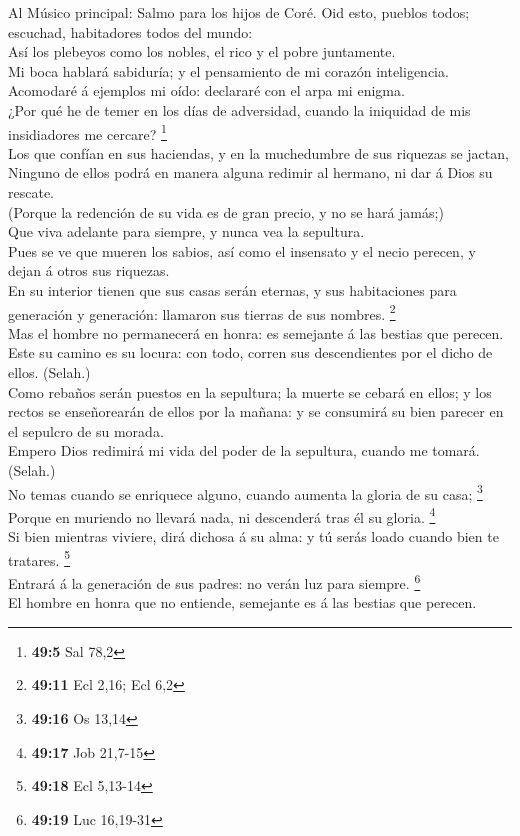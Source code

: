  Al Músico principal: Salmo para los hijos de Coré. Oid
esto, pueblos todos; escuchad, habitadores todos del mundo:\\
 Así los plebeyos como los nobles, el rico y el pobre
juntamente.\\
 Mi boca hablará sabiduría; y el pensamiento de mi corazón
inteligencia.\\
 Acomodaré á ejemplos mi oído: declararé con el arpa mi
enigma.\\
 ¿Por qué he de temer en los días de adversidad, cuando la
iniquidad de mis insidiadores me cercare? \footnote{\textbf{49:5} Sal
  78,2}\\
 Los que confían en sus haciendas, y en la muchedumbre de
sus riquezas se jactan,\\
 Ninguno de ellos podrá en manera alguna redimir al
hermano, ni dar á Dios su rescate.\\
 (Porque la redención de su vida es de gran precio, y no
se hará jamás;)\\
 Que viva adelante para siempre, y nunca vea la
sepultura.\\
 Pues se ve que mueren los sabios, así como el insensato
y el necio perecen, y dejan á otros sus riquezas.\\
 En su interior tienen que sus casas serán eternas, y sus
habitaciones para generación y generación: llamaron sus tierras de sus
nombres. \footnote{\textbf{49:11} Ecl 2,16; Ecl 6,2}\\
 Mas el hombre no permanecerá en honra: es semejante á
las bestias que perecen.\\
 Este su camino es su locura: con todo, corren sus
descendientes por el dicho de ellos. (Selah.)\\
 Como rebaños serán puestos en la sepultura; la muerte se
cebará en ellos; y los rectos se enseñorearán de ellos por la mañana: y
se consumirá su bien parecer en el sepulcro de su morada.\\
 Empero Dios redimirá mi vida del poder de la sepultura,
cuando me tomará. (Selah.)\\
 No temas cuando se enriquece alguno, cuando aumenta la
gloria de su casa; \footnote{\textbf{49:16} Os 13,14}\\
 Porque en muriendo no llevará nada, ni descenderá tras
él su gloria. \footnote{\textbf{49:17} Job 21,7-15}\\
 Si bien mientras viviere, dirá dichosa á su alma: y tú
serás loado cuando bien te tratares. \footnote{\textbf{49:18} Ecl
  5,13-14}\\
 Entrará á la generación de sus padres: no verán luz para
siempre. \footnote{\textbf{49:19} Luc 16,19-31}\\
 El hombre en honra que no entiende, semejante es á las
bestias que perecen.

